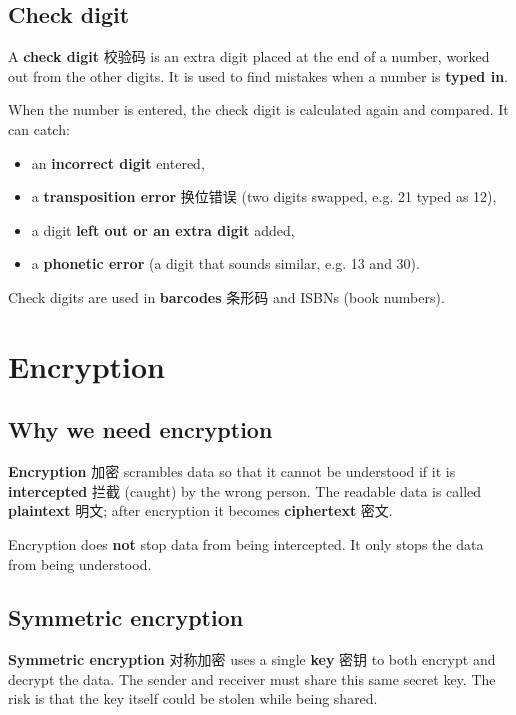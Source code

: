 \documentclass[11pt]{article}
\begin{document}
\subsection*{Check digit}

A \textbf{check digit} 校验码 is an extra digit placed at the end of a number, worked out from the other digits. It is used to find mistakes when a number is \textbf{typed in}.

When the number is entered, the check digit is calculated again and compared. It can catch:

\begin{itemize}
\item an \textbf{incorrect digit} entered,

\item a \textbf{transposition error} 换位错误 (two digits swapped, e.g. 21 typed as 12),

\item a digit \textbf{left out or an extra digit} added,

\item a \textbf{phonetic error} (a digit that sounds similar, e.g. 13 and 30).

\end{itemize}

Check digits are used in \textbf{barcodes} 条形码 and ISBNs (book numbers).

\section*{Encryption}

\subsection*{Why we need encryption}

\textbf{Encryption} 加密 scrambles data so that it cannot be understood if it is \textbf{intercepted} 拦截 (caught) by the wrong person. The readable data is called \textbf{plaintext} 明文; after encryption it becomes \textbf{ciphertext} 密文.

Encryption does \textbf{not} stop data from being intercepted. It only stops the data from being understood.

\subsection*{Symmetric encryption}

\textbf{Symmetric encryption} 对称加密 uses a single \textbf{key} 密钥 to both encrypt and decrypt the data. The sender and receiver must share this same secret key. The risk is that the key itself could be stolen while being shared.
\end{document}

